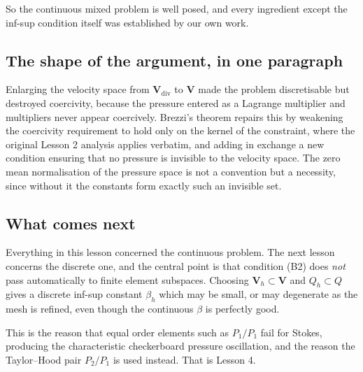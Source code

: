 \documentclass[11pt,a4paper]{article}
\newcommand{\Vdiv}{\mathbf{V}_{\mathrm{div}}}
\newcommand{\Vsp}{\mathbf{V}}
\newcommand{\Qsp}{Q}
\begin{document}
So the continuous mixed problem is well posed, and every ingredient except the
inf-sup condition itself was established by our own work.

\subsection{The shape of the argument, in one paragraph}

Enlarging the velocity space from $\Vdiv$ to $\Vsp$ made the problem
discretisable but destroyed coercivity, because the pressure entered as a
Lagrange multiplier and multipliers never appear coercively. Brezzi's theorem
repairs this by weakening the coercivity requirement to hold only on the kernel
of the constraint, where the original Lesson 2 analysis applies verbatim, and
adding in exchange a new condition ensuring that no pressure is invisible to the
velocity space. The zero mean normalisation of the pressure space is not a
convention but a necessity, since without it the constants form exactly such an
invisible set.

\subsection{What comes next}

Everything in this lesson concerned the continuous problem. The next lesson
concerns the discrete one, and the central point is that condition (B2) does
\emph{not} pass automatically to finite element subspaces. Choosing
$\Vsp_{h} \subset \Vsp$ and $\Qsp_{h} \subset \Qsp$ gives a discrete inf-sup
constant $\beta_{h}$ which may be small, or may degenerate as the mesh is
refined, even though the continuous $\beta$ is perfectly good.

This is the reason that equal order elements such as $P_{1}/P_{1}$ fail for
Stokes, producing the characteristic checkerboard pressure oscillation, and the
reason the Taylor--Hood pair $P_{2}/P_{1}$ is used instead. That is Lesson 4.
\end{document}

